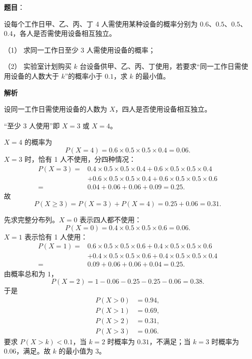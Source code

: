 \begin{answer}

\textbf{题目}：

设每个工作日甲、乙、丙、丁 4 人需使用某种设备的概率分别为 $0.6$、$0.5$、$0.5$、$0.4$，各人是否需使用设备相互独立。

（1） 求同一工作日至少 3 人需使用设备的概率；

（2） 实验室计划购买 $k$ 台设备供甲、乙、丙、丁使用，若要求“同一工作日需使用设备的人数大于 $k$”的概率小于 $0.1$，求 $k$ 的最小值。

\textbf{解析}

设同一工作日需使用设备的人数为 $X$，四人是否使用设备相互独立。


“至少 3 人使用”即 $X=3$ 或 $X=4$。

$X=4$ 的概率为
\nopagebreak[4]
\[P(X=4)=0.6\times0.5\times0.5\times0.4=0.06.\]
$X=3$ 时，恰有 1 人不使用，分四种情况：
\nopagebreak[4]
\[\begin{aligned}
P(X=3)
={}&0.4\times0.5\times0.5\times0.4
+0.6\times0.5\times0.5\times0.4\\
&+0.6\times0.5\times0.5\times0.4
+0.6\times0.5\times0.5\times0.6\\
={}&0.04+0.06+0.06+0.09=0.25.
\end{aligned}\]
故
\nopagebreak[4]
\[P(X\geqslant3)=P(X=3)+P(X=4)=0.25+0.06=0.31.\]


先求完整分布列。$X=0$ 表示四人都不使用：
\nopagebreak[4]
\[P(X=0)=0.4\times0.5\times0.5\times0.6=0.06.\]
$X=1$ 表示恰有 1 人使用：
\nopagebreak[4]
\[\begin{aligned}
P(X=1)
={}&0.6\times0.5\times0.5\times0.6
+0.4\times0.5\times0.5\times0.6\\
&+0.4\times0.5\times0.5\times0.6
+0.4\times0.5\times0.5\times0.4\\
={}&0.09+0.06+0.06+0.04=0.25.
\end{aligned}\]
由概率总和为 $1$，
\nopagebreak[4]
\[P(X=2)=1-0.06-0.25-0.25-0.06=0.38.\]
于是
\nopagebreak[4]
\[\begin{aligned}
P(X>0)&=0.94,\\
P(X>1)&=0.69,\\
P(X>2)&=0.31,\\
P(X>3)&=0.06.
\end{aligned}\]
要求 $P(X>k)<0.1$，当 $k=2$ 时概率为 $0.31$，不满足；当 $k=3$ 时概率为 $0.06$，满足。故 $k$ 的最小值为 $3$。



\end{answer}

